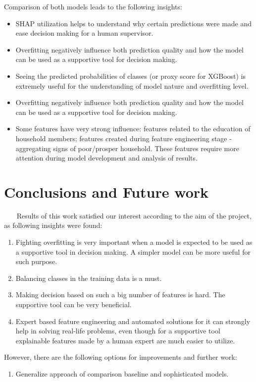         Comparison of both models leads to the following insights:
        \begin{itemize}
            \item SHAP utilization helps to understand why certain predictions were made and ease decision making for a human supervisor.
            \item Overfitting negatively influence both prediction quality and how the model can be used as a supportive tool for decision making.
            \item Seeing the predicted probabilities of classes (or proxy score for XGBoost) is extremely useful for the understanding of model nature and overfitting level.
            \item Overfitting negatively influence both prediction quality and how the model can be used as a supportive tool for decision making.
            \item Some features have very strong influence: features related to the education of household members; features created during feature engineering stage - aggregating signs of poor/prosper household. These features require more attention during model development and analysis of results.
        \end{itemize}
        
\section{Conclusions and Future work}~~~
    Results of this work satisfied our interest according to the aim of the project, as following insights were found:
    \begin{enumerate}
        \item Fighting overfitting is very important when a model is expected to be used as a supportive tool in decision making. A simpler model can be more useful for such purpose.
        \item Balancing classes in the training data is a must.
        \item Making decision based on such a big number of features is hard. The supportive tool can be very beneficial. 
        \item Expert based feature engineering and automated solutions for it can strongly help in solving real-life problems, even though for a supportive tool explainable features made by a human expert are much easier to utilize.
    \end{enumerate}
    
    However, there are the following options for improvements and further work:
    \begin{enumerate}
        \item Generalize approach of comparison baseline and sophisticated models.
    \end{enumerate}




